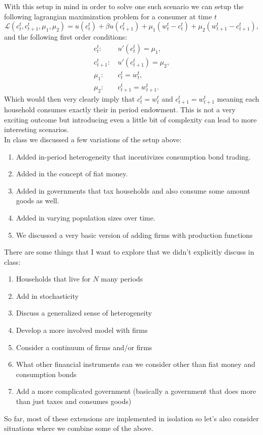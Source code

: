 \documentclass[11pt,english]{article}
\begin{document}
\noindent With this setup in mind in order to solve one such scenario we can setup the following lagrangian maximization problem for a consumer at time $t$ $$\mathcal{L}(c_t^t, c_{t+1}^t, \mu_1, \mu_2) = u\left(c_t^t\right) + \beta u\left(c_{t+1}^t\right) + \mu_1\left(w_t^t - c_t^t\right) + \mu_2\left(w_{t+1}^t - c_{t+1}^t\right),$$ and the following first order conditions:
\begin{align*}
	c_t^t:\,& u'\left(c_t^t\right) = \mu_1,\\
	c_{t+1}^t:\,& u'\left(c_{t+1}^t\right) = \mu_2,\\
	\mu_1:\,& c_t^t = w_t^t,\\
	\mu_2:\,& c_{t+1}^t = w_{t+1}^t.
\end{align*} Which would then very clearly imply that $c_t^t = w_t^t$ and $c_{t+1}^t = w_{t+1}^t$ meaning each household consumes exactly their in period endowment. This is not a very exciting outcome but introducing even a little bit of complexity can lead to more interesting scenarios.\\

\noindent In class we discussed a few variations of the setup above:\begin{enumerate}
	\item Added in-period heterogeneity that incentivizes consumption bond trading.

	\item Added in the concept of fiat money.

	\item Added in governments that tax households and also consume some amount goods as well.

	\item Added in varying population sizes over time.

	\item We discussed a very basic version of adding firms with production functions
\end{enumerate} There are some things that I want to explore that we didn't explicitly discuss in class:
\begin{enumerate}
	\item Households that live for $N$ many periods

	\item  Add in stochasticity

	\item Discuss a generalized sense of heterogeneity

	\item Develop a more involved model with firms

	\item Consider a continuum of firms and/or firms

	\item What other financial instruments can we consider other than fiat money and consumption bonds

	\item Add a more complicated government (basically a government that does more than just taxes and consumes goods)
\end{enumerate}

So far, most of these extensions are implemented in isolation so let's also consider situations where we combine some of the above.
\end{document}
